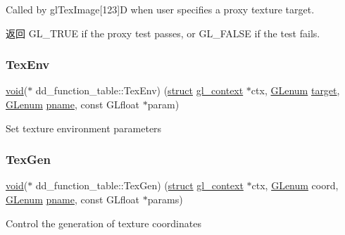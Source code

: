Called by gl\+Tex\+Image\mbox{[}123\mbox{]}D when user specifies a proxy texture target.

\begin{DoxyReturn}{返回}
G\+L\+\_\+\+T\+R\+UE if the proxy test passes, or G\+L\+\_\+\+F\+A\+L\+SE if the test fails. 
\end{DoxyReturn}
\mbox{\label{structdd__function__table_a118b549ff1f5cda1b0214062d013f6cd}} 
\subsubsection{\texorpdfstring{Tex\+Env}{TexEnv}}
{\footnotesize\ttfamily \hyperlink{interfacevoid}{void}($\ast$ dd\+\_\+function\+\_\+table\+::\+Tex\+Env) (\hyperlink{interfacestruct}{struct} \hyperlink{structgl__context}{gl\+\_\+context} $\ast$ctx, \hyperlink{interfacevoid}{G\+Lenum} \hyperlink{interfacevoid}{target}, \hyperlink{interfacevoid}{G\+Lenum} \hyperlink{interfacevoid}{pname}, const G\+Lfloat $\ast$param)}

Set texture environment parameters \mbox{\label{structdd__function__table_a89a6ee25a5d54cd2461ade62048f4051}} 
\subsubsection{\texorpdfstring{Tex\+Gen}{TexGen}}
{\footnotesize\ttfamily \hyperlink{interfacevoid}{void}($\ast$ dd\+\_\+function\+\_\+table\+::\+Tex\+Gen) (\hyperlink{interfacestruct}{struct} \hyperlink{structgl__context}{gl\+\_\+context} $\ast$ctx, \hyperlink{interfacevoid}{G\+Lenum} coord, \hyperlink{interfacevoid}{G\+Lenum} \hyperlink{interfacevoid}{pname}, const G\+Lfloat $\ast$params)}

Control the generation of texture coordinates \mbox{\label{structdd__function__table_a0907a18e4f97b0e8f36e50d8f5e7e369}} 
